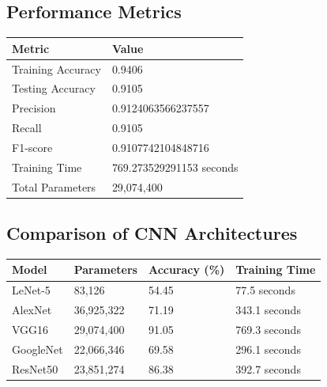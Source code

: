 \documentclass[11pt]{article}
\begin{document}
\subsection{Performance Metrics}
\begin{table}[H]
\centering
\begin{tabular}{|l|p{6cm}|}
\hline
\textbf{Metric} & \textbf{Value} \\ \hline
Training Accuracy &  0.9406 \\ \hline
Testing Accuracy & 0.9105 \\ \hline
Precision &  0.9124063566237557 \\ \hline
Recall & 0.9105 \\ \hline
F1-score &  0.9107742104848716 \\ \hline
Training Time & 769.273529291153 seconds\\ \hline
Total Parameters & 29,074,400 \\ \hline
\end{tabular}
\end{table}

\subsection{Comparison of CNN Architectures}
\begin{table}[H]
\centering
\begin{tabular}{|l|l|l|l|}
\hline
\textbf{Model} & \textbf{Parameters} & \textbf{Accuracy (\%)} & \textbf{Training Time} \\ \hline
LeNet-5 & 83,126 & 54.45 & 77.5 seconds\\ \hline
AlexNet & 36,925,322 & 71.19	& 343.1 seconds\\ \hline
VGG16 & 29,074,400 & 91.05 & 769.3 seconds \\ \hline
GoogleNet & 22,066,346 & 69.58 & 296.1 seconds \\ \hline
ResNet50 & 23,851,274 & 86.38 & 392.7 seconds\\ \hline
\end{tabular}
\end{table}
\end{document}
